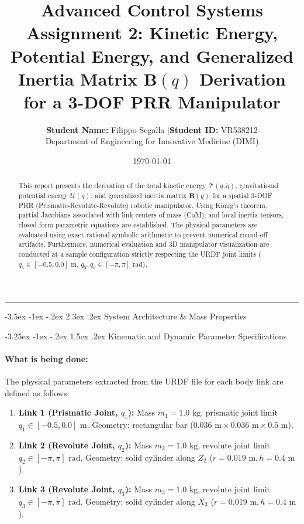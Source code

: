 \documentclass[11pt, a4paper]{article}
\title{
    \vspace{-1cm}
    \color{brandblue}\textbf{Advanced Control Systems}\\[0.3em]
    \Large\textbf{Assignment 2: Kinetic Energy, Potential Energy, and Generalized Inertia Matrix $\mathbf{B}(q)$ Derivation for a 3-DOF PRR Manipulator}
}
\author{\textbf{Student Name:} Filippo Segalla \quad|\quad \textbf{Student ID:} VR538212\\[0.2em]
\small Department of Engineering for Innovative Medicine (DIMI) }
\date{\today}
\makeatletter
\renewcommand{\section}{\@startsection{section}{1}{\z@}%
    {-3.5ex \@plus -1ex \@minus -.2ex}%
    {2.3ex \@plus .2ex}%
    {\normalfont\Large\bfseries\color{brandblue}}}
\renewcommand{\subsection}{\@startsection{subsection}{2}{\z@}%
    {-3.25ex \@plus -1ex \@minus -.2ex}%
    {1.5ex \@plus .2ex}%
    {\normalfont\large\bfseries\color{brandaccent}}}
\makeatother
\begin{document}
\maketitle
\thispagestyle{empty}

\begin{abstract}
This report presents the derivation of the total kinetic energy $\mathcal{T}(q, \dot{q})$, gravitational potential energy $\mathcal{U}(q)$, and generalized inertia matrix $\mathbf{B}(q)$ for a spatial 3-DOF PRR (Prismatic-Revolute-Revolute) robotic manipulator. Using König's theorem, partial Jacobians associated with link centers of mass (CoM), and local inertia tensors, closed-form parametric equations are established. The physical parameters are evaluated using exact rational symbolic arithmetic to prevent numerical round-off artifacts. Furthermore, numerical evaluation and 3D manipulator visualization are conducted at a sample configuration strictly respecting the URDF joint limits ($q_1 \in [-0.5, 0.0]\text{ m}$, $q_2, q_3 \in [-\pi, \pi]\text{ rad}$).
\end{abstract}

\hrule
\vspace{1.5em}

\section{System Architecture \& Mass Properties}

\subsection{Kinematic and Dynamic Parameter Specifications}
\paragraph{What is being done:}
The physical parameters extracted from the URDF file for each body link are defined as follows:
\begin{enumerate}[leftmargin=1.5em]
    \item \textbf{Link 1 (Prismatic Joint, $q_1$):} Mass $m_1 = 1.0\text{ kg}$, prismatic joint limit $q_1 \in [-0.5, 0.0]\text{ m}$. Geometry: rectangular bar ($0.036\text{ m} \times 0.036\text{ m} \times 0.5\text{ m}$).
    \item \textbf{Link 2 (Revolute Joint, $q_2$):} Mass $m_2 = 1.0\text{ kg}$, revolute joint limit $q_2 \in [-\pi, \pi]\text{ rad}$. Geometry: solid cylinder along $Z_2$ ($r = 0.019\text{ m}, h = 0.4\text{ m}$).
    \item \textbf{Link 3 (Revolute Joint, $q_3$):} Mass $m_3 = 1.0\text{ kg}$, revolute joint limit $q_3 \in [-\pi, \pi]\text{ rad}$. Geometry: solid cylinder along $X_3$ ($r = 0.019\text{ m}, h = 0.4\text{ m}$).
\end{enumerate}
\end{document}
